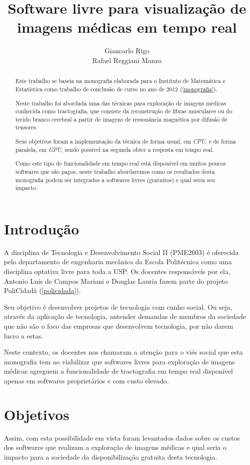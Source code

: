 \documentclass[a4paper,11pt]{report}
\title{Software livre para visualização de imagens médicas em tempo real}
\author{Giancarlo Rigo\\
        Rafael Reggiani Manzo}
\begin{document}
\maketitle
\tableofcontents

\begin{abstract}
Este trabalho se baseia na monografia elaborada para o Instituto de Matemática e Estatística como trabalho de conclusão de curso no ano de 2012 (\ref{monografia}).

Neste trabalho foi abordada uma das técnicas para exploração de imagens médicas conhecida como tractografia, que consiste da reconstrução de fibras musculares ou do tecido branco cerebral a partir de imagens de ressonância magnética por difusão de tensores.

Seus objetivos foram a implementação da técnica de forma usual, em \textit{CPU}, e de forma paralela, em \textit{GPU}, sendo possível na segunda obter a resposta em tempo real.

Como este tipo de funcionalidade em tempo real está disponível em muitos poucos softwares que são pagos, neste trabalho abordaremos como os resultados desta monografia podem ser integrados a softwares livres (gratuitos) e qual seria seu impacto.
\end{abstract}

\chapter{Introdução}
A disciplina de Tecnologia e Desenvolvimento Social II (PME2603) é oferecida pelo departamento de engenharia mecânica da Escola Politécnica como uma disciplina optativa livre para toda a USP. Os docentes responsáveis por ela, Antonio Luis de Campos Mariani e Douglas Lauria fazem parte do projeto PoliCidadã (\ref{policidada}).

Seu objetivo é desenvolver projetos de tecnologia com cunho social. Ou seja, através da aplicação de tecnologia, antender demandas de membros da sociedade que não são o foco das empresas que desenvolvem tecnologia, por não darem lucro a estas.

Neste contexto, os docentes nos chamaram a atenção para o viés social que esta monografia tem ao viabilizar que softwares livres para exploração de imagens médicas agreguem a funcionalidade de tractografia em tempo real disponível apenas em softwares proprietários e com custo elevado.

\chapter{Objetivos}
Assim, com esta possibilidade em vista foram levantados dados sobre os custos dos softwares que realizam a exploração de imagens médicas e qual seria o impacto para a sociedade da disponibilização gratuita desta tecnologia.
\end{document}
